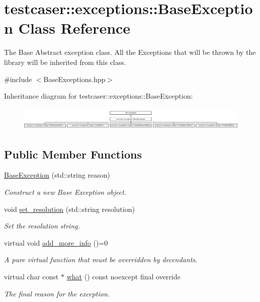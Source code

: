 \hypertarget{classtestcaser_1_1exceptions_1_1BaseException}{}\section{testcaser\+:\+:exceptions\+:\+:Base\+Exception Class Reference}
\label{classtestcaser_1_1exceptions_1_1BaseException}


The Base Abstract exception class. All the Exceptions that will be thrown by the library will be inherited from this class.  




{\ttfamily \#include $<$Base\+Exceptions.\+hpp$>$}

Inheritance diagram for testcaser\+:\+:exceptions\+:\+:Base\+Exception\+:\begin{figure}[H]
\begin{center}
\leavevmode
\includegraphics[height=1.135135cm]{classtestcaser_1_1exceptions_1_1BaseException}
\end{center}
\end{figure}
\subsection*{Public Member Functions}
\begin{DoxyCompactItemize}
\item 
\mbox{\hyperlink{classtestcaser_1_1exceptions_1_1BaseException_a70b5f42e6197e2600f7163f843060af2}{Base\+Exception}} (std\+::string reason)
\begin{DoxyCompactList}\small\item\em Construct a new Base Exception object. \end{DoxyCompactList}\item 
void \mbox{\hyperlink{classtestcaser_1_1exceptions_1_1BaseException_a92c371d40b0f3dbaa7de968ea67e5211}{set\+\_\+resolution}} (std\+::string resolution)
\begin{DoxyCompactList}\small\item\em Set the resolution string. \end{DoxyCompactList}\item 
virtual void \mbox{\hyperlink{classtestcaser_1_1exceptions_1_1BaseException_ad607ea04e2cb4ad9b8d0e2e6b6734f2f}{add\+\_\+more\+\_\+info}} ()=0
\begin{DoxyCompactList}\small\item\em A pure virtual function that must be overridden by decendants. \end{DoxyCompactList}\item 
virtual char const  $\ast$ \mbox{\hyperlink{classtestcaser_1_1exceptions_1_1BaseException_a28590a861913f870d9761990853e74b7}{what}} () const noexcept final override
\begin{DoxyCompactList}\small\item\em The final reason for the exception. \end{DoxyCompactList}\end{DoxyCompactItemize}
